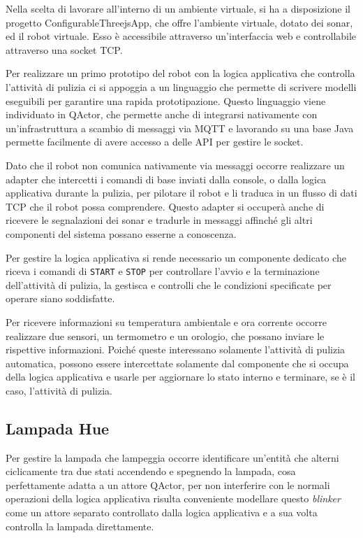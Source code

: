Nella scelta di lavorare all'interno di un ambiente virtuale, si ha a disposizione il progetto ConfigurableThreejsApp, che offre l'ambiente virtuale, dotato dei sonar, ed il robot virtuale. Esso è accessibile attraverso un'interfaccia web e controllabile attraverso una socket TCP.

Per realizzare un primo prototipo del robot con la logica applicativa che controlla l'attività di pulizia ci si appoggia a un linguaggio che permette di scrivere modelli eseguibili per garantire una rapida prototipazione. Questo linguaggio viene individuato in QActor, che permette anche di integrarsi nativamente con un'infrastruttura a scambio di messaggi via MQTT e lavorando su una base Java permette facilmente di avere accesso a delle API per gestire le socket.

Dato che il robot non comunica nativamente via messaggi occorre realizzare un adapter che intercetti i comandi di base inviati dalla console, o dalla logica applicativa durante la pulizia, per pilotare il robot e li traduca in un flusso di dati TCP che il robot possa comprendere. Questo adapter si occuperà anche di ricevere le segnalazioni dei sonar e tradurle in messaggi affinché gli altri componenti del sistema possano esserne a conoscenza.

Per gestire la logica applicativa si rende necessario un componente dedicato che riceva i comandi di \texttt{START} e \texttt{STOP} per controllare l'avvio e la terminazione dell'attività di pulizia, la gestisca e controlli che le condizioni specificate per operare siano soddisfatte.

Per ricevere informazioni su temperatura ambientale e ora corrente occorre realizzare due sensori, un termometro e un orologio, che possano inviare le rispettive informazioni. Poiché queste interessano solamente l'attività di pulizia automatica, possono essere intercettate solamente dal componente che si occupa della logica applicativa e usarle per aggiornare lo stato interno e terminare, se è il caso, l'attività di pulizia.

\subsection{Lampada Hue}
Per gestire la lampada che lampeggia occorre identificare un'entità che alterni ciclicamente tra due stati accendendo e spegnendo la lampada, cosa perfettamente adatta a un attore QActor, per non interferire con le normali operazioni della logica applicativa risulta conveniente modellare questo \textit{blinker} come un attore separato controllato dalla logica applicativa e a sua volta controlla la lampada direttamente.

